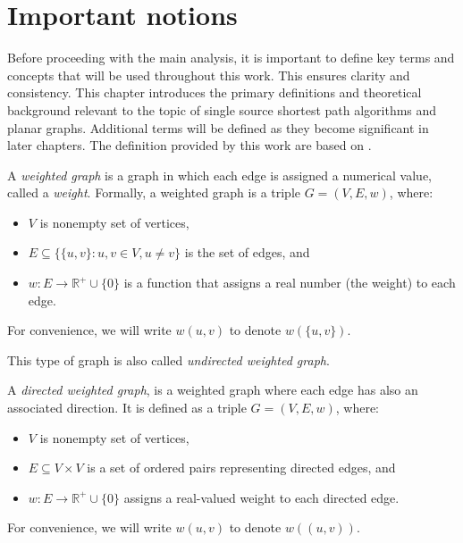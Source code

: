 \section{Important notions}

Before proceeding with the main analysis, it is important to define key terms and concepts that will be used throughout this work. This ensures clarity and consistency. This chapter introduces the primary definitions and theoretical background relevant to the topic of single source shortest path algorithms and planar graphs. Additional terms will be defined as they become significant in later chapters. The definition provided by this work are based on \cite{graphDefn, blue_book,frederickson}.

\begin{defn}
A \emph{weighted graph} is a graph in which each edge is assigned a numerical value, called a \emph{weight}. Formally, a weighted graph is a triple $ G = (V, E, w) $, where:
\begin{itemize}
  \item $V$ is nonempty set of vertices,
  \item $E \subseteq \{ \{u, v\} : u, v \in V, u \neq v \} $ is the set of edges, and
  \item $ w: E \rightarrow \mathbb{R}^+ \cup \{0\} $ is a function that assigns a real number (the weight) to each edge.
\end{itemize}
For convenience, we will write $w(u,v)$ to denote $w(\{u,v\})$.
\end{defn}

This type of graph is also called \emph{undirected weighted graph}.

\begin{defn} 
    A \emph{directed weighted graph}, is a weighted graph where each edge has also an associated direction. It is defined as a triple $G = (V, E, w)$, where:
\begin{itemize}
  \item $V$ is nonempty set of vertices,
  \item $E \subseteq V \times V $ is a set of ordered pairs representing directed edges, and
  \item $ w: E \rightarrow \mathbb{R}^+ \cup \{0\} $ assigns a real-valued weight to each directed edge.
\end{itemize}
For convenience, we will write $w(u,v)$ to denote $w((u,v))$.
\end{defn}

